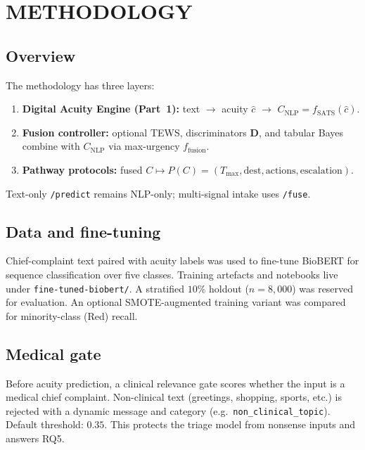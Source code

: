 \chapter{METHODOLOGY}
\label{ch:method}

\section{Overview}

The methodology has three layers:

\begin{enumerate}
  \item \textbf{Digital Acuity Engine (Part~1):} text \(\to\) acuity \(\hat{c}\) \(\to\) \(C_{\mathrm{NLP}}=f_{\mathrm{SATS}}(\hat{c})\).
  \item \textbf{Fusion controller:} optional TEWS, discriminators \(\mathbf{D}\), and tabular Bayes combine with \(C_{\mathrm{NLP}}\) via max-urgency \(f_{\mathrm{fusion}}\).
  \item \textbf{Pathway protocols:} fused \(C\mapsto P(C)=(T_{\max},\mathrm{dest},\mathrm{actions},\mathrm{escalation})\).
\end{enumerate}

Text-only \texttt{/predict} remains NLP-only; multi-signal intake uses \texttt{/fuse}.

\section{Data and fine-tuning}

Chief-complaint text paired with acuity labels was used to fine-tune BioBERT for sequence classification over five classes. Training artefacts and notebooks live under \texttt{fine-tuned-biobert/}. A stratified \(10\%\) holdout (\(n=8{,}000\)) was reserved for evaluation. An optional SMOTE-augmented training variant was compared for minority-class (Red) recall.

\section{Medical gate}

Before acuity prediction, a clinical relevance gate scores whether the input is a medical chief complaint. Non-clinical text (greetings, shopping, sports, etc.) is rejected with a dynamic message and category (e.g.\ \texttt{non\_clinical\_topic}). Default threshold: \(0.35\). This protects the triage model from nonsense inputs and answers RQ5.

